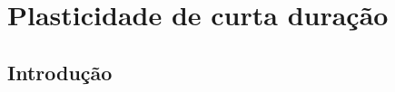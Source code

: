 \chapter{Plasticidade de curta duração}\label{cap:plasticidade}
\section{Introdução}\label{sec:plasticidade_intro}
